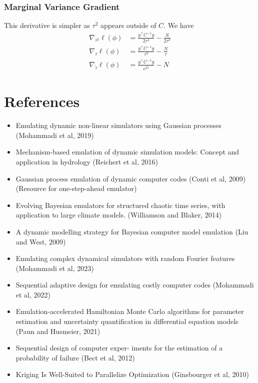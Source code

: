 \documentclass[12pt]{article}
\begin{document}
\subsubsection{Marginal Variance Gradient}
This derivative is simpler as $\tau^2$ appears outside of $C$. We have 
\begin{align*}
\nabla_{\tau^2} \ell(\phi) &= \frac{y^\top C^{-1} y}{2\tau^4} - \frac{N}{2\tau^2} \\
\nabla_{\tau} \ell(\phi) &= \frac{y^\top C^{-1} y}{\tau^3} - \frac{N}{\tau} \\
\nabla_{\tilde{\tau}} \ell(\phi) &= \frac{y^\top C^{-1} y}{e^{2\tilde{\tau}}} - N
\end{align*}



 



\section{References}
\begin{itemize}
\item Emulating dynamic non-linear simulators using Gaussian processes (Mohammadi et al, 2019)
\item Mechanism-based emulation of dynamic simulation models: Concept and application in hydrology (Reichert et al, 2016)
\item Gaussian process emulation of dynamic computer codes (Conti et al, 2009) (Resource for one-step-ahead emulator)
\item Evolving Bayesian emulators for structured chaotic time series, with application to large climate models. (Williamson and Blaker, 2014)
\item A dynamic modelling strategy for Bayesian computer model emulation (Liu and West, 2009)
\item Emulating complex dynamical simulators with random Fourier features (Mohammadi et al, 2023)
\item Sequential adaptive design for emulating costly computer codes (Mohammadi et al, 2022)
\item Emulation-accelerated Hamiltonian Monte Carlo algorithms for parameter estimation and uncertainty quantification in differential equation models (Paun and Husmeier, 2021)
\item Sequential design of computer exper- iments for the estimation of a probability of failure (Bect et al, 2012)
\item Kriging Is Well-Suited to Parallelize Optimization (Ginsbourger et al, 2010)
\end{itemize}
\end{document}
